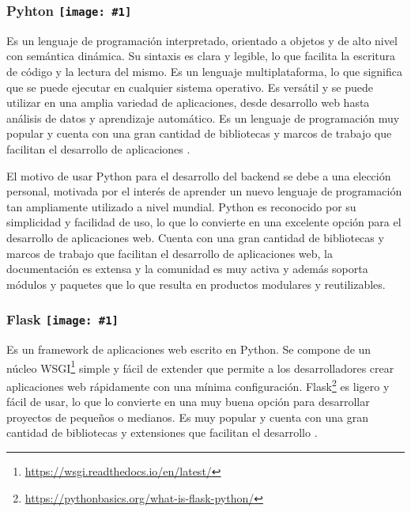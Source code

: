 
\renewcommand{\icon}[1]{\texttt{[image: \#1]}}
\subsubsection*{Pyhton \protect\icon{./imagenes/python_logo.png}}
Es un lenguaje de programación interpretado, orientado a objetos y de alto nivel con semántica dinámica. Su sintaxis es clara y legible, lo que facilita la escritura de código y la lectura del mismo. Es un lenguaje multiplataforma, lo que significa que se puede ejecutar en cualquier sistema operativo. Es versátil y se puede utilizar en una amplia variedad de aplicaciones, desde desarrollo web hasta análisis de datos y aprendizaje automático. Es un lenguaje de programación muy popular y cuenta con una gran cantidad de bibliotecas y marcos de trabajo que facilitan el desarrollo de aplicaciones \cite{python2021python}.\newline

El motivo de usar Python para el desarrollo del backend se debe a una elección personal, motivada por el interés de aprender un nuevo lenguaje de programación tan ampliamente utilizado a nivel mundial. Python es reconocido por su simplicidad y facilidad de uso, lo que lo convierte en una excelente opción para el desarrollo de aplicaciones web. Cuenta con una gran cantidad de bibliotecas y marcos de trabajo que facilitan el desarrollo de aplicaciones web, la documentación es extensa y la comunidad es muy activa y además soporta módulos y paquetes que lo que resulta en productos modulares y reutilizables.

\renewcommand{\icon}[1]{\texttt{[image: \#1]}}
\subsubsection*{Flask \protect\icon{./imagenes/flask_logo.png}}

Es un framework de aplicaciones web escrito en Python. Se compone de un núcleo WSGI\footnote{\url{https://wsgi.readthedocs.io/en/latest/}} simple y fácil de extender que permite a los desarrolladores crear aplicaciones web rápidamente con una mínima configuración. Flask\footnote{\url{https://pythonbasics.org/what-is-flask-python/}} es ligero y fácil de usar, lo que lo convierte en una muy buena opción para desarrollar proyectos de pequeños o medianos. Es muy popular y cuenta con una gran cantidad de bibliotecas y extensiones que facilitan el desarrollo \cite{grinberg2018flask}.\newline

